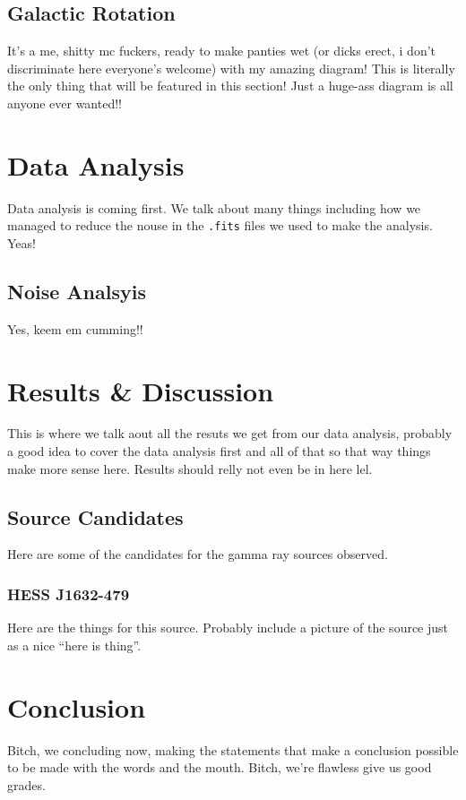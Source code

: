 \documentclass[a4paper, titlepage, oneside]{article}
\begin{document}
\begin{multicols}{2}
\subsection{Galactic Rotation}
It's a me, shitty mc fuckers, ready to make panties wet (or dicks erect, i don't discriminate here everyone's welcome) with my amazing diagram! This is literally the only thing that will be featured in this section! Just a huge-ass diagram is all anyone ever wanted!!

\section{Data Analysis}
Data analysis is coming first. We talk about many things including how we managed to reduce the nouse in the \texttt{.fits} files we used to make the analysis. Yeas!

\subsection{Noise Analsyis}
Yes, keem em cumming!!

\section{Results \& Discussion}
This is where we talk aout all the resuts we get from our data analysis, probably a good idea to cover the data analysis first and all of that so that way things make more sense here. Results should relly not even be in here lel.

\subsection{Source Candidates}
Here are some of the candidates for the gamma ray sources observed.

\subsubsection{HESS J1632-479}
Here are the things for this source. Probably include a picture of the source just as a nice ``here is thing''.

\section{Conclusion}
Bitch, we concluding now, making the statements that make a conclusion possible to be made with the words and the mouth. Bitch, we're flawless give us good grades.
\end{multicols}

\printbibliography[heading=bibintoc]
\end{document}

